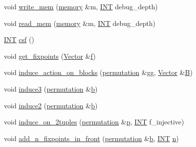 \begin{DoxyCompactItemize}
\item 
void \mbox{\hyperlink{classpermutation_af4fd9ef2f599afdac92272358c4b8665}{write\+\_\+mem}} (\mbox{\hyperlink{classmemory}{memory}} \&m, \mbox{\hyperlink{galois_8h_a09fddde158a3a20bd2dcadb609de11dc}{I\+NT}} debug\+\_\+depth)
\item 
void \mbox{\hyperlink{classpermutation_ad3c756e8f0db2c95dfa7e6834c4bbaa3}{read\+\_\+mem}} (\mbox{\hyperlink{classmemory}{memory}} \&m, \mbox{\hyperlink{galois_8h_a09fddde158a3a20bd2dcadb609de11dc}{I\+NT}} debug\+\_\+depth)
\item 
\mbox{\hyperlink{galois_8h_a09fddde158a3a20bd2dcadb609de11dc}{I\+NT}} \mbox{\hyperlink{classpermutation_a121bb8f936f6e1e4101ef59d04c3998a}{csf}} ()
\item 
void \mbox{\hyperlink{classpermutation_ac4a8b92b8d658b8dbe8d3cf6791855f8}{get\+\_\+fixpoints}} (\mbox{\hyperlink{class_vector}{Vector}} \&\mbox{\hyperlink{alphabet2_8_c_a362077c979b0bb65159c603270e40f70}{f}})
\item 
void \mbox{\hyperlink{classpermutation_aa059d415966f85e6cf0753f20b80d4ab}{induce\+\_\+action\+\_\+on\+\_\+blocks}} (\mbox{\hyperlink{classpermutation}{permutation}} \&gg, \mbox{\hyperlink{class_vector}{Vector}} \&\mbox{\hyperlink{costas_8_c_ad1f767566c3189fb90e9cffcc5dd4680}{B}})
\item 
void \mbox{\hyperlink{classpermutation_a159dadce81dccf039f1a41825a0bb49e}{induce3}} (\mbox{\hyperlink{classpermutation}{permutation}} \&\mbox{\hyperlink{alphabet2_8_c_a148e3876077787926724625411d6e7a9}{b}})
\item 
void \mbox{\hyperlink{classpermutation_abfb30803652293a57f3cb1816b692153}{induce2}} (\mbox{\hyperlink{classpermutation}{permutation}} \&\mbox{\hyperlink{alphabet2_8_c_a148e3876077787926724625411d6e7a9}{b}})
\item 
void \mbox{\hyperlink{classpermutation_a55823b01d08ca0624a98d943da83245c}{induce\+\_\+on\+\_\+2tuples}} (\mbox{\hyperlink{classpermutation}{permutation}} \&\mbox{\hyperlink{alphabet2_8_c_a533391314665d6bf1b5575e9a9cd8552}{p}}, \mbox{\hyperlink{galois_8h_a09fddde158a3a20bd2dcadb609de11dc}{I\+NT}} f\+\_\+injective)
\item 
void \mbox{\hyperlink{classpermutation_a72b61b599c699c4db5d030970bf7534e}{add\+\_\+n\+\_\+fixpoints\+\_\+in\+\_\+front}} (\mbox{\hyperlink{classpermutation}{permutation}} \&\mbox{\hyperlink{alphabet2_8_c_a148e3876077787926724625411d6e7a9}{b}}, \mbox{\hyperlink{galois_8h_a09fddde158a3a20bd2dcadb609de11dc}{I\+NT}} \mbox{\hyperlink{simeon_8_c_a7f2cd26777ce0ff3fdaf8d02aacbddfb}{n}})

\end{DoxyCompactItemize}
